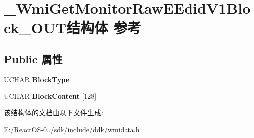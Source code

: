 \hypertarget{struct___wmi_get_monitor_raw_e_edid_v1_block___o_u_t}{}\section{\+\_\+\+Wmi\+Get\+Monitor\+Raw\+E\+Edid\+V1\+Block\+\_\+\+O\+U\+T结构体 参考}
\label{struct___wmi_get_monitor_raw_e_edid_v1_block___o_u_t}
\subsection*{Public 属性}
\begin{DoxyCompactItemize}
\item 
\mbox{\label{struct___wmi_get_monitor_raw_e_edid_v1_block___o_u_t_a175dceb4c17ffbc80147e1675effe42c}} 
U\+C\+H\+AR {\bfseries Block\+Type}
\item 
\mbox{\label{struct___wmi_get_monitor_raw_e_edid_v1_block___o_u_t_afcff8b1ffc933c6c798e0d2aba37a9ee}} 
U\+C\+H\+AR {\bfseries Block\+Content} \mbox{[}128\mbox{]}
\end{DoxyCompactItemize}


该结构体的文档由以下文件生成\+:\begin{DoxyCompactItemize}
\item 
E\+:/\+React\+O\+S-\/0../sdk/include/ddk/wmidata.\+h\end{DoxyCompactItemize}
